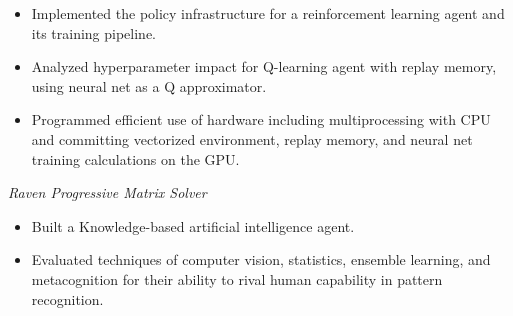 \documentclass[11pt]{res}%
\begin{document}
\begin{resume}
\begin{adjustwidth}{0.05\textwidth}{0.0\textwidth}
\begin{itemize}%
\setlength\itemsep{-0.2em}%
\item%
Implemented the policy infrastructure for a reinforcement learning agent and its training pipeline.%
\item%
Analyzed hyperparameter impact for Q{-}learning agent with replay memory, using neural net as a Q approximator.%
\item%
Programmed efficient use of hardware including multiprocessing with CPU and committing vectorized environment, replay memory, and neural net training calculations on the GPU.%
\end{itemize}
\end{adjustwidth}%
\begin{adjustwidth}{0.05\textwidth}{0.0\textwidth}
\textit{Raven Progressive Matrix Solver}
\vspace*{-0.010000\textwidth}
\begin{itemize}%
\setlength\itemsep{-0.2em}%
\item%
Built a Knowledge{-}based artificial intelligence agent.%
\item%
Evaluated techniques of computer vision, statistics, ensemble learning, and metacognition for their ability to rival human capability in pattern recognition.%
\end{itemize}
\end{adjustwidth}



\end{resume}
\end{document}
